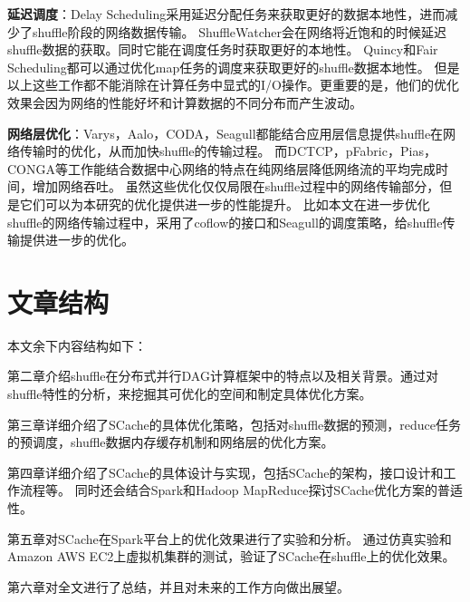 \textbf{延迟调度}：Delay Scheduling\cite{delay}采用延迟分配任务来获取更好的数据本地性，进而减少了shuffle阶段的网络数据传输。
ShuffleWatcher\cite{shufflewatcher}会在网络将近饱和的时候延迟shuffle数据的获取。同时它能在调度任务时获取更好的本地性。
Quincy\cite{quincy}和Fair Scheduling\cite{preemptive}都可以通过优化map任务的调度来获取更好的shuffle数据本地性。
但是以上这些工作都不能消除在计算任务中显式的I/O操作。更重要的是，他们的优化效果会因为网络的性能好坏和计算数据的不同分布而产生波动。

\textbf{网络层优化}：Varys\cite{varys}，Aalo\cite{aalo}，CODA\cite{coda}，Seagull\cite{seagull}都能结合应用层信息提供shuffle在网络传输时的优化，从而加快shuffle的传输过程。
而DCTCP\cite{dctcp}，pFabric\cite{pfabric}，Pias\cite{pias}，CONGA\cite{conga}等工作能结合数据中心网络的特点在纯网络层降低网络流的平均完成时间，增加网络吞吐。
虽然这些优化仅仅局限在shuffle过程中的网络传输部分，但是它们可以为本研究的优化提供进一步的性能提升。
比如本文在进一步优化shuffle的网络传输过程中，采用了coflow\cite{coflow}的接口和Seagull的调度策略，给shuffle传输提供进一步的优化。

\section{文章结构}

本文余下内容结构如下：

第二章介绍shuffle在分布式并行DAG计算框架中的特点以及相关背景。通过对shuffle特性的分析，来挖掘其可优化的空间和制定具体优化方案。

第三章详细介绍了SCache的具体优化策略，包括对shuffle数据的预测，reduce任务的预调度，shuffle数据内存缓存机制和网络层的优化方案。

第四章详细介绍了SCache的具体设计与实现，包括SCache的架构，接口设计和工作流程等。
同时还会结合Spark\cite{apachespark}和Hadoop MapReduce\cite{hadoop}探讨SCache优化方案的普适性。

第五章对SCache在Spark\cite{apachespark}平台上的优化效果进行了实验和分析。
通过仿真实验和Amazon AWS EC2上虚拟机集群的测试，验证了SCache在shuffle上的优化效果。

第六章对全文进行了总结，并且对未来的工作方向做出展望。







